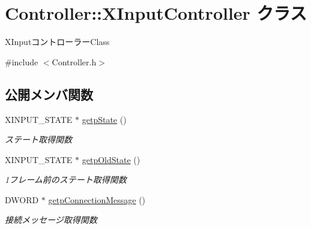 \hypertarget{class_controller_1_1_x_input_controller}{}\section{Controller\+:\+:X\+Input\+Controller クラス}
\label{class_controller_1_1_x_input_controller}


X\+Inputコントローラー\+Class  




{\ttfamily \#include $<$Controller.\+h$>$}

\subsection*{公開メンバ関数}
\begin{DoxyCompactItemize}
\item 
X\+I\+N\+P\+U\+T\+\_\+\+S\+T\+A\+TE $\ast$ \mbox{\hyperlink{class_controller_1_1_x_input_controller_afee7c8104fdee4da995b2fdcf57985e3}{getp\+State}} ()
\begin{DoxyCompactList}\small\item\em ステート取得関数 \end{DoxyCompactList}\item 
X\+I\+N\+P\+U\+T\+\_\+\+S\+T\+A\+TE $\ast$ \mbox{\hyperlink{class_controller_1_1_x_input_controller_aa8341af2132808335e28268e57b7ffc2}{getp\+Old\+State}} ()
\begin{DoxyCompactList}\small\item\em 1フレーム前のステート取得関数 \end{DoxyCompactList}\item 
D\+W\+O\+RD $\ast$ \mbox{\hyperlink{class_controller_1_1_x_input_controller_a5c87f062465413fbb4c9ebfeace86fed}{getp\+Connection\+Message}} ()
\begin{DoxyCompactList}\small\item\em 接続メッセージ取得関数 \end{DoxyCompactList}\end{DoxyCompactItemize}
